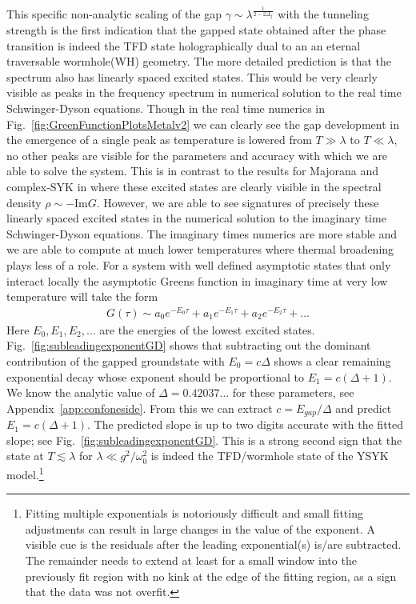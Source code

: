 This specific non-analytic scaling of the gap $\gamma \sim \lambda^{\frac{1}{2-2\Delta_f}}$ with the tunneling strength is the first indication that the gapped state obtained after the phase transition  is indeed the TFD state holographically dual to an 
an eternal traversable wormhole(WH) geometry. The more detailed prediction is that the spectrum also has linearly spaced excited states. This would be very clearly visible as peaks in the frequency spectrum in numerical solution to the real time Schwinger-Dyson equations. Though in the real time numerics in 
Fig.~\ref{fig:GreenFunctionPlotsMetalv2} we can clearly see the gap development  in the emergence of a single peak as temperature is lowered from $T\gg \lambda $ to $T\ll \lambda$, no other peaks are visible for the parameters and accuracy with which we are able to solve the system. This is in contrast to the results for Majorana and complex-SYK in \cite{pluggeRevivalDynamicsTraversable2020a,sahoo_traversable_2020}
 where these excited states are clearly visible in the spectral density $\rho \sim -\text{Im}G$. 
However, we are able to see signatures of precisely these linearly spaced excited states in the numerical solution to the imaginary time Schwinger-Dyson equations. The imaginary times numerics are more stable and we are able to compute at much lower temperatures where thermal broadening plays less of a role. For a system with well defined asymptotic states that only interact locally the asymptotic Greens function in imaginary time at very low temperature will take the form
\begin{align}
    G(\tau) \sim a_0e^{-E_0\tau} +a_1 e^{-E_1\tau} +a_2e^{-E_2\tau} +\ldots
    \label{eq:SumExponentsSchem}
\end{align}
Here $E_0, E_1, E_2, \ldots$ are the energies of the lowest excited states.
Fig.~\ref{fig:subleadingexponentGD} shows that subtracting out the dominant contribution of the gapped groundstate with $E_0 = c\Delta$ shows a clear remaining exponential decay whose exponent should be proportional to $E_1 = c(\Delta+1)$. We know the analytic value of $\Delta= 0.42037\ldots$ for these parameters, see Appendix~\ref{app:confoneside}. 
From this we can extract $c=E_{gap}/\Delta$ and predict $E_1=c(\Delta+1)$. The predicted slope is up to two digits accurate with the fitted slope; see Fig.~\ref{fig:subleadingexponentGD}. This is a strong second sign that the state at $T\lesssim \lambda$ for $\lambda\ll g^{2}/\omega_0^2$  is indeed the TFD/wormhole state of the YSYK model.\footnote{Fitting multiple exponentials is notoriously difficult and small fitting adjustments can result in large changes in the value of the exponent. A visible cue is the residuals after the leading exponential(s) is/are subtracted. The remainder needs to extend at least for a small window into the previously fit region with no kink at the edge of the fitting region, as a sign that the data was not overfit.}
 

